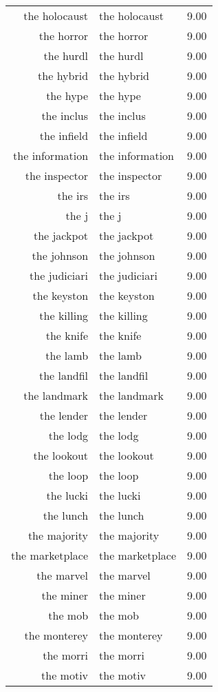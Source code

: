 \begin{table}[ht]
\begin{tabular}{rlr}
  the holocaust & the holocaust & 9.00 \\ 
  the horror & the horror & 9.00 \\ 
  the hurdl & the hurdl & 9.00 \\ 
  the hybrid & the hybrid & 9.00 \\ 
  the hype & the hype & 9.00 \\ 
  the inclus & the inclus & 9.00 \\ 
  the infield & the infield & 9.00 \\ 
  the information & the information & 9.00 \\ 
  the inspector & the inspector & 9.00 \\ 
  the irs & the irs & 9.00 \\ 
  the j & the j & 9.00 \\ 
  the jackpot & the jackpot & 9.00 \\ 
  the johnson & the johnson & 9.00 \\ 
  the judiciari & the judiciari & 9.00 \\ 
  the keyston & the keyston & 9.00 \\ 
  the killing & the killing & 9.00 \\ 
  the knife & the knife & 9.00 \\ 
  the lamb & the lamb & 9.00 \\ 
  the landfil & the landfil & 9.00 \\ 
  the landmark & the landmark & 9.00 \\ 
  the lender & the lender & 9.00 \\ 
  the lodg & the lodg & 9.00 \\ 
  the lookout & the lookout & 9.00 \\ 
  the loop & the loop & 9.00 \\ 
  the lucki & the lucki & 9.00 \\ 
  the lunch & the lunch & 9.00 \\ 
  the majority & the majority & 9.00 \\ 
  the marketplace & the marketplace & 9.00 \\ 
  the marvel & the marvel & 9.00 \\ 
  the miner & the miner & 9.00 \\ 
  the mob & the mob & 9.00 \\ 
  the monterey & the monterey & 9.00 \\ 
  the morri & the morri & 9.00 \\ 
  the motiv & the motiv & 9.00 \\ 

\end{tabular}
\end{table}
